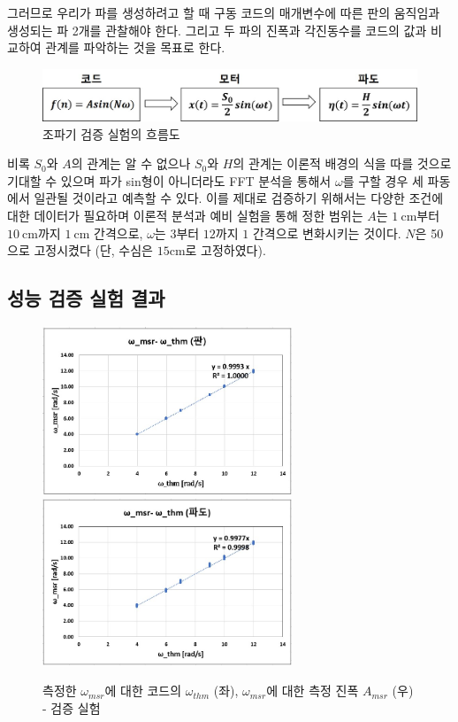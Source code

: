 그러므로 우리가 파를 생성하려고 할 때 구동 코드의 매개변수에 따른 판의 움직임과 생성되는 파 2개를 관찰해야 한다. 그리고 두 파의 진폭과 각진동수를 코드의 값과 비교하여 관계를 파악하는 것을 목표로 한다.

\begin{figure}[H]
    \centering
    \includegraphics[width=12cm]{images/Flow_Chart(Analysis System_Kor).jpg}
    \caption{조파기 검증 실험의 흐름도}
    \label{Flow_Chart}
\end{figure}

비록 $S_0$와 $A$의 관계는 알 수 없으나 $S_0$와 $H$의 관계는 이론적 배경의 식을 따를 것으로 기대할 수 있으며 파가 sin형이 아니더라도 FFT 분석을 통해서 $\omega$를 구할 경우 세 파동에서 일관될 것이라고 예측할 수 있다.
이를 제대로 검증하기 위해서는 다양한 조건에 대한 데이터가 필요하며 이론적 분석과 예비 실험을 통해 정한 범위는 $A$는 $1\mathrm{~cm}$부터 $10\mathrm{~cm}$까지 $1\mathrm{~cm}$ 간격으로, $\omega$는 $3$부터 $12$까지 $1$ 간격으로 변화시키는 것이다. $N$은 50으로 고정시켰다 (단, 수심은 $15\mathrm{cm}$로 고정하였다).


\subsection{성능 검증 실험 결과}

\begin{figure}[H]
    \centering
    \includegraphics[height=5cm]{images/Experiment(omega_thm-omega_msr)_Plate_Kor.jpg}
    \includegraphics[height=5cm]{images/Experiment(omega_thm-omega_msr)_Wave_Kor.jpg}
    \caption{측정한 $\omega_{msr}$에 대한 코드의 $\omega_{thm}$ (좌),  $\omega_{msr}$에 대한 측정 진폭 $A_{msr}$ (우) - 검증 실험}
    \label{ExperimentGraph - 1, 2}
\end{figure}

